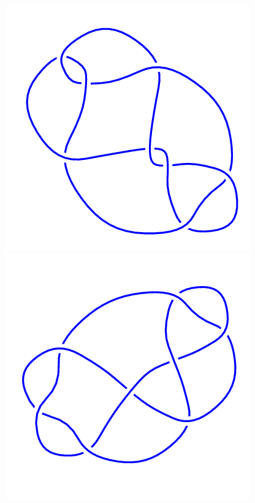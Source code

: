 \begin{figure}[H]
    \begin{minipage}[b]{.18\linewidth}
        \centering
        \includegraphics[width=\linewidth]{../data/8_12.png}
    \end{minipage}
    \begin{minipage}[b]{.18\linewidth}
        \centering
        \includegraphics[width=\linewidth]{../data/8_13.png}

\end{minipage}
\end{figure}

